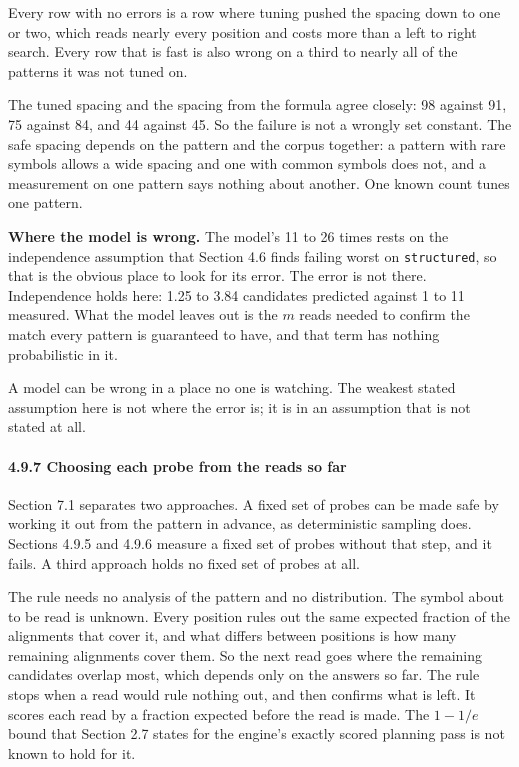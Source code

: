 Every row with no errors is a row where tuning pushed the spacing down to one or two, which reads nearly every position and costs more than a left to right search. Every row that is fast is also wrong on a third to nearly all of the patterns it was not tuned on.

The tuned spacing and the spacing from the formula agree closely: 98 against 91, 75 against 84, and 44 against 45. So the failure is not a wrongly set constant. The safe spacing depends on the pattern and the corpus together: a pattern with rare symbols allows a wide spacing and one with common symbols does not, and a measurement on one pattern says nothing about another. One known count tunes one pattern.

\noindent\textbf{Where the model is wrong.} The model's 11 to 26 times rests on the independence assumption that Section 4.6 finds failing worst on \texttt{structured}, so that is the obvious place to look for its error. The error is not there. Independence holds here: 1.25 to 3.84 candidates predicted against 1 to 11 measured. What the model leaves out is the \(m\) reads needed to confirm the match every pattern is guaranteed to have, and that term has nothing probabilistic in it.

A model can be wrong in a place no one is watching. The weakest stated assumption here is not where the error is; it is in an assumption that is not stated at all.

\paragraph{4.9.7 Choosing each probe from the reads so far}

Section 7.1 separates two approaches. A fixed set of probes can be made safe by working it out from the pattern in advance, as deterministic sampling does. Sections 4.9.5 and 4.9.6 measure a fixed set of probes without that step, and it fails. A third approach holds no fixed set of probes at all.

The rule needs no analysis of the pattern and no distribution. The symbol about to be read is unknown. Every position rules out the same expected fraction of the alignments that cover it, and what differs between positions is how many remaining alignments cover them. So the next read goes where the remaining candidates overlap most, which depends only on the answers so far. The rule stops when a read would rule nothing out, and then confirms what is left. It scores each read by a fraction expected before the read is made. The \(1 - 1/e\) bound that Section 2.7 states for the engine's exactly scored planning pass is not known to hold for it.

